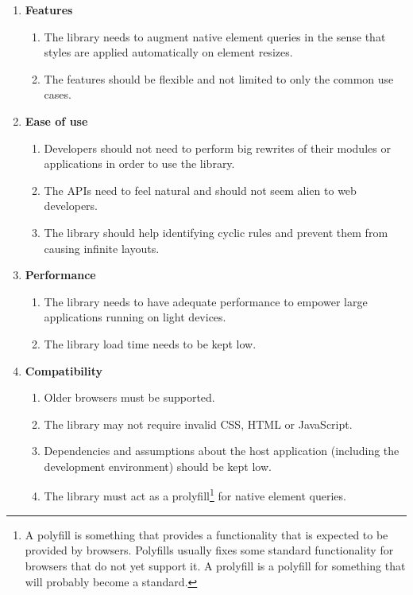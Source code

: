 \documentclass[a4paper,11pt]{kth-mag}
\begin{document}
      \begin{enumerate}
        \item \textbf{Features}
          \begin{enumerate}
            \item\label{itm:req_resize_detect} The library needs to augment \gls{native} element queries in the sense that styles are applied automatically on \gls{element} resizes.
            \item The features should be flexible and not limited to only the common use cases.
          \end{enumerate}
        \item \textbf{Ease of use}
          \begin{enumerate}
            \item\label{itm:req_big_rewrite} Developers should not need to perform big rewrites of their modules or applications in order to use the library.
            \item\label{itm:natural} The \glspl{API} need to feel natural and should not seem alien to \gls{web} developers.
            \item The library should help identifying cyclic rules and prevent them from causing infinite layouts.
          \end{enumerate}
        \item \textbf{Performance}
          \begin{enumerate}
            \item The library needs to have adequate performance to empower large applications running on light devices.
            \item The library load time needs to be kept low.
          \end{enumerate}
        \item \textbf{Compatibility}
          \begin{enumerate}
            \item Older \glspl{browser} must be supported.
            \item The library may not require invalid \gls{CSS}, \gls{HTML} or \gls{JavaScript}.
            \item\label{itm:assumption} Dependencies and assumptions about the host application (including the development environment) should be kept low.
            \item\label{itm:req_prolyfill} The library must act as a prolyfill\footnote{A polyfill is something that provides a functionality that is expected to be provided  by \glspl{browser}. Polyfills usually fixes some standard functionality for \glspl{browser} that do not yet support it. A prolyfill is a polyfill for something that will probably become a standard.} for \gls{native} element queries.
          \end{enumerate}
      \end{enumerate}
\end{document}

